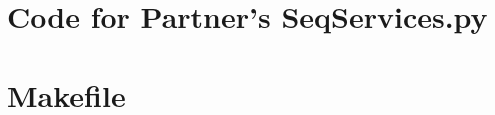 \documentclass[12pt]{article}
\begin{document}

\newpage

\section{Code for Partner's SeqServices.py}


\newpage

\section{Makefile}

\lstset{language=make}
\noindent 
\end{document}
